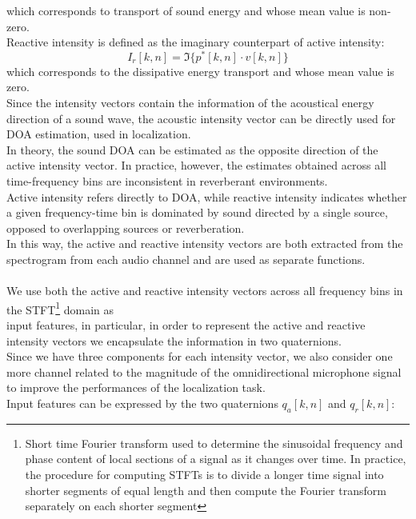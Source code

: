 \documentclass{article}
\begin{document}
    which corresponds to transport of sound energy and whose mean value is non-zero.
    \\ Reactive intensity is defined as the imaginary counterpart of active intensity:
    \begin{equation*}
        I_r [k,n]= \Im \{ p^*[k,n] \cdot v[k,n]\} 
    \end{equation*}
    which corresponds to the dissipative energy transport and whose mean value is zero.
    \\ Since the intensity vectors contain the information of the acoustical energy direction of a sound wave, the acoustic intensity
    vector can be directly used for DOA estimation, used in localization.
    \\ In theory, the sound DOA can be estimated as the opposite direction of the active intensity vector. In practice, however, 
    the estimates obtained across all time-frequency bins are inconsistent in reverberant environments.
    \\ Active intensity refers directly to DOA, while reactive intensity indicates whether a given frequency-time bin is dominated
    by sound directed by a single source, opposed to overlapping sources or reverberation. 
    \\ In this way, the active and reactive intensity vectors are both extracted from the spectrogram from each audio channel and 
    are used as separate functions.
    \\ \\ We use both the active and reactive intensity vectors across all frequency bins in the STFT\footnote{Short time Fourier
    transform used to determine the sinusoidal frequency and phase content of local sections of a signal as it changes over time. In 
    practice, the procedure for computing STFTs is to divide a longer time signal into shorter segments of equal length and then 
    compute the Fourier transform separately on each shorter segment} domain as \\ input features, in particular,  in order to represent 
    the active and reactive intensity vectors we encapsulate the information in two quaternions. 
    \\  Since we have three components for each intensity vector, we also consider one more channel related to the magnitude of the
    omnidirectional microphone signal to improve the performances of the localization task.
    \\ Input features can be expressed by the two quaternions $q_a[k,n]$ and $q_r[k,n]$:
\end{document}
